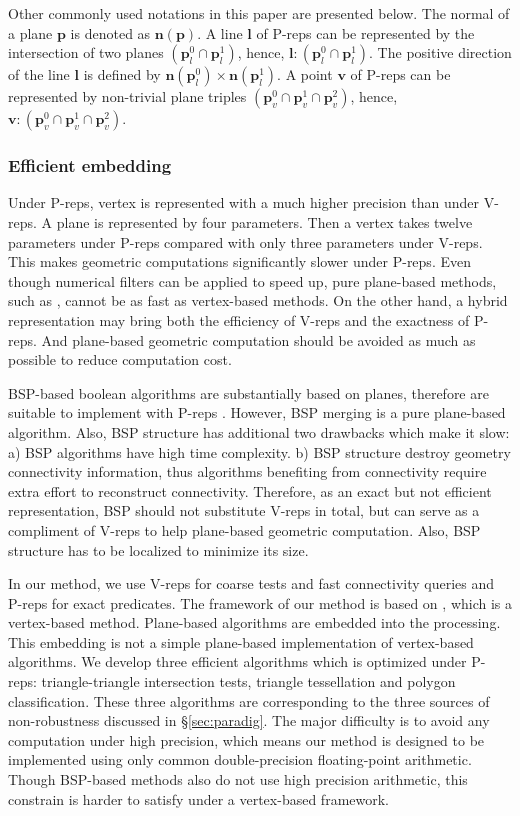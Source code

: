 Other commonly used notations in this paper are presented below. The normal of a plane $\bm{p}$ is denoted as $\bm{n}(\bm{p})$. A line $\bm{l}$ of P-reps can be represented by the intersection of two planes $(\bm{p}_l^0 \cap \bm{p}_l^1)$, hence, $\bm{l}\colon(\bm{p}_l^0 \cap \bm{p}_l^1)$. The positive direction of the line $\bm{l}$ is defined by $\bm{n}(\bm{p}_l^0) \times \bm{n}(\bm{p}_l^1)$.
A point $\bm{v}$ of P-reps can be represented by non-trivial plane triples $(\bm{p}_v^0 \cap \bm{p}_v^1 \cap \bm{p}_v^2)$, hence, $\bm{v}\colon(\bm{p}_v^0 \cap \bm{p}_v^1 \cap \bm{p}_v^2)$.

\subsubsection{Efficient embedding}

Under P-reps, vertex is represented with a much higher precision than under V-reps. A plane is represented by four parameters. Then a vertex takes twelve parameters under P-reps compared with only three parameters under V-reps. This makes geometric computations significantly slower under P-reps. Even though numerical filters can be applied to speed up, pure plane-based methods, such as \cite{sugihara1990solid,banerjee1996topologically}, cannot be as fast as vertex-based methods. On the other hand, a hybrid representation may bring both the efficiency of V-reps and the exactness of P-reps. And plane-based geometric computation should be avoided as much as possible to reduce computation cost.

BSP-based boolean algorithms are substantially based on planes, therefore are suitable to implement with P-reps \cite{bernstein2009fast,campen2010exact}. However, BSP merging is a pure plane-based algorithm. Also, BSP structure has additional two drawbacks which make it slow: a) BSP algorithms have high time complexity. b) BSP structure destroy geometry connectivity information, thus algorithms benefiting from connectivity require extra effort to reconstruct connectivity. Therefore, as an exact but not efficient representation, BSP should not substitute V-reps in total, but can serve as a compliment of V-reps to help plane-based geometric computation. Also, BSP structure has to be localized to minimize its size.

In our method, we use V-reps for coarse tests and fast connectivity queries and P-reps for exact predicates. The framework of our method is based on \cite{ogayar2015deferred}, which is a vertex-based method. Plane-based algorithms are embedded into the processing. This embedding is not a simple plane-based implementation of vertex-based algorithms. We develop three efficient algorithms which is optimized under P-reps: triangle-triangle intersection tests, triangle tessellation and polygon classification. These three algorithms are corresponding to the three sources of non-robustness discussed in \S\ref{sec:paradig}. The major difficulty is to avoid any computation under high precision, which means our method is designed to be implemented using only common double-precision floating-point arithmetic. Though BSP-based methods \cite{bernstein2009fast,campen2010exact} also do not use high precision arithmetic, this constrain is harder to satisfy under a vertex-based framework.


